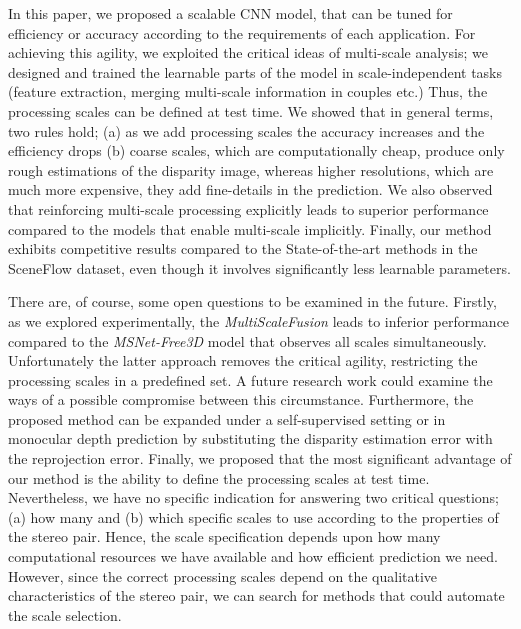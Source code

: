 \documentclass[runningheads]{llncs}
\begin{document}
In this paper, we proposed a scalable CNN model, that can be tuned for efficiency or accuracy according to the requirements of each application. For achieving this agility, we exploited the critical ideas of multi-scale analysis; we designed and trained the learnable parts of the model in scale-independent tasks (feature extraction, merging multi-scale information in couples etc.) Thus, the processing scales can be defined at test time. We showed that in general terms, two rules hold; (a) as we add processing scales the accuracy increases and the efficiency drops (b) coarse scales, which are computationally cheap, produce only rough estimations of the disparity image, whereas higher resolutions, which are much more expensive, they add fine-details in the prediction. We also observed that reinforcing multi-scale processing explicitly leads to superior performance compared to the models that enable multi-scale implicitly. Finally, our method exhibits competitive results compared to the State-of-the-art methods in the SceneFlow dataset, even though it involves significantly less learnable parameters.

There are, of course, some open questions to be examined in the future. Firstly, as we explored experimentally, the \textit{MultiScaleFusion} leads to inferior performance compared to the \textit{MSNet-Free3D} model that observes all scales simultaneously. Unfortunately the latter approach removes the critical agility, restricting the processing scales in a predefined set. A future research work could examine the ways of a possible compromise between this circumstance. Furthermore, the proposed method can be expanded under a self-supervised setting or in monocular depth prediction by substituting the disparity estimation error with the reprojection error. Finally, we proposed that the most significant advantage of our method is the ability to define the processing scales at test time.  Nevertheless, we have no specific indication for answering two critical questions; (a) how many and (b) which specific scales to use according to the properties of the stereo pair. Hence, the scale specification depends upon how many computational resources we have available and how efficient prediction we need. However, since the correct processing scales depend on the qualitative characteristics of the stereo pair, we can search for methods that could automate the scale selection.

\clearpage


\end{document}
